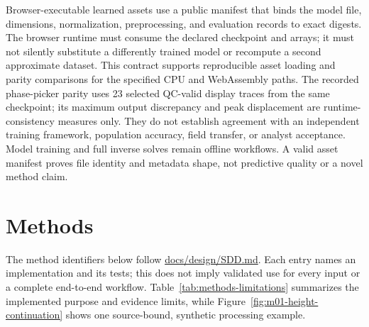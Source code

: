 Browser-executable learned assets use a public manifest that binds the
model file, dimensions, normalization, preprocessing, and evaluation
records to exact digests. The browser runtime must consume the declared
checkpoint and arrays; it must not silently substitute a differently
trained model or recompute a second approximate dataset. This contract
supports reproducible asset loading and parity comparisons for the
specified CPU and WebAssembly paths. The recorded phase-picker parity
uses 23 selected QC-valid display traces from the same checkpoint; its
maximum output discrepancy and peak displacement are runtime-consistency
measures only. They do not establish agreement with an independent
training framework, population accuracy, field transfer, or analyst
acceptance. Model training and full inverse solves remain offline
workflows. A valid asset manifest proves file identity and metadata
shape, not predictive quality or a novel method claim.

\section{Methods}\label{methods}

The method identifiers below follow \url{docs/design/SDD.md}. Each entry
names an implementation and its tests; this does not imply validated use
for every input or a complete end-to-end workflow.
Table~\ref{tab:methods-limitations} summarizes the implemented purpose
and evidence limits, while Figure~\ref{fig:m01-height-continuation}
shows one source-bound, synthetic processing example.

